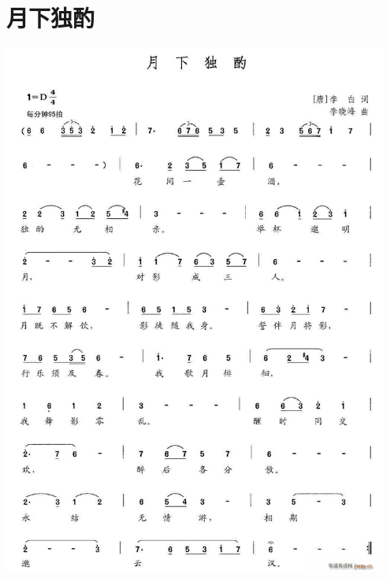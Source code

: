\documentclass[cn,pad,twocol]{elegantbook}
\begin{document}
\section{月下独酌}
    \includegraphics[width=0.95\textwidth]{dongxiao/20200808-月下独酌-李白.jpg} 
\end{document}
